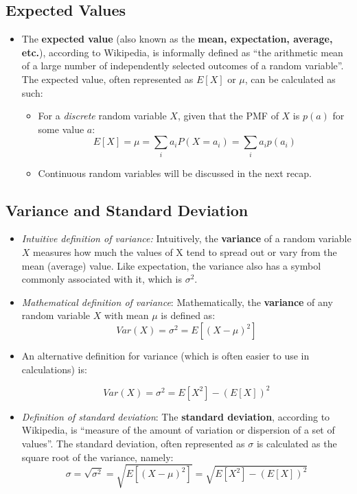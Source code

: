 \documentclass[12pt]{article}
\begin{document}
\subsection{Expected Values}
\begin{itemize}
	\item The \textbf{expected value} (also known as the \textbf{mean, expectation,
		      average, etc.}), according to Wikipedia, is informally
	      defined as ``the arithmetic mean of a large number of independently selected
	      outcomes of a random variable''. The expected value, often represented as $E[X]$ or $\mu$,
	      can be calculated as such:
	      \begin{itemize}
		      \item For a \textit{discrete} random variable $X$, given that the PMF of $X$ is $p(a)$ for some value $a$:
		            \[
			            E[X] = \mu = \displaystyle\sum_{i} a_i P(X=a_i) = \displaystyle\sum_{i} a_i p(a_i)
		            \]
		      \item Continuous random variables will be discussed in the next recap.
	      \end{itemize}
\end{itemize}


\subsection{Variance and Standard Deviation}
\begin{itemize}
	\item \textit{Intuitive definition of variance:} Intuitively, the \textbf{variance} of a random variable $X$ measures how much
	      the values of X tend to spread out or vary from the mean (average) value. Like
	      expectation, the variance also has a symbol commonly associated with it, which is $\sigma^2$.
	\item \textit{Mathematical definition of variance}: Mathematically, the \textbf{variance} of any random variable $X$ with mean $\mu$
	      is defined as:
	      \[
		      Var(X) = \sigma^2 = E[(X-\mu)^2]
	      \]
	\item  An alternative definition for variance (which is often easier to use in calculations) is:

	      \[
		      Var(X) = \sigma^2 = E[X^2] - (E[X])^2
	      \]
	\item \textit{Definition of standard deviation}: The \textbf{standard
		      deviation}, according to Wikipedia, is ``measure of the amount of
	      variation or dispersion of a set of values''. The standard deviation,
	      often represented as $\sigma$ is calculated as the square root of the
	      variance, namely:
	      \[
		      \sigma = \sqrt{\sigma^2} = \sqrt{E[(X-\mu)^2]} = \sqrt{E[X^2] - (E[X])^2}
	      \]
\end{itemize}
\end{document}
